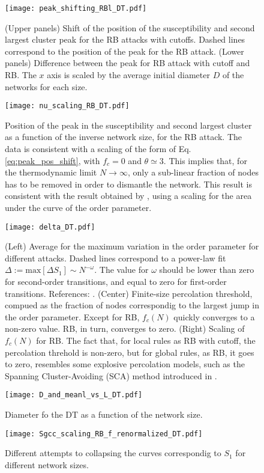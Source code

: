 \documentclass{article}
\begin{document}
\begin{figure}
\centering
\texttt{[image: peak\_shifting\_RBl\_DT.pdf]}
\caption{(Upper panels) Shift of the position of the susceptibility and second largest cluster peak for the RB attacks with cutoffs. Dashed lines correspond to the position of the peak for the RB attack. (Lower panels) Difference between the peak for RB attack with cutoff and RB. The $x$ axis is scaled by the average initial diameter $D$ of the networks for each size.}
\end{figure}

\begin{figure}
\centering
\texttt{[image: nu\_scaling\_RB\_DT.pdf]}
\caption{Position of the peak in the susceptibility and second largest cluster as a function of the inverse network size, for the RB attack. The data is consistent with a scaling of the form of Eq. \ref{eq:peak_pos_shift}, with $f_c = 0$ and $\theta \simeq 3$. This implies that, for the thermodynamic limit $N\rightarrow \infty$, only a sub-linear fraction of nodes has to be removed in order to dismantle the network. This result is consistent with the result obtained by \cite{Norrenbrock2016FragmentationAttacks}, using a scaling for the area under the curve of the order parameter.}
\end{figure}


\begin{figure}
\centering
\texttt{[image: delta\_DT.pdf]}
\caption{(Left) Average for the maximum variation in the order parameter for different attacks. Dashed lines correspond to a power-law fit $\Delta := \mathrm{max}[\Delta S_1] \sim N^{-\omega}$. The value for $\omega$ should be lower than zero for second-order transitions, and equal to zero for first-order transitions. References: \cite{Trevelyan2018DegreeInformation,Bastas2014a,Nagler2011a,Fan2020}. (Center) Finite-size percolation threshold, compued as the fraction of nodes correspondig to the largest jump in the order parameter. Except for RB, $f_c(N)$ quickly converges to a non-zero value. RB, in turn, converges to zero. (Right) Scaling of $f_c(N)$ for RB. The fact that, for local rules as RB with cutoff, the percolation threhold is non-zero, but for global rules, as RB, it goes to zero, resembles some explosive percolation models, such as the Spanning Cluster-Avoiding (SCA) method introduced in \cite{Cho2013}. }
\end{figure}

\begin{figure}
\centering
\texttt{[image: D\_and\_meanl\_vs\_L\_DT.pdf]}
\caption{Diameter fo the DT as a function of the network size.}
\end{figure}

\begin{figure}
\centering
\texttt{[image: Sgcc\_scaling\_RB\_f\_renormalized\_DT.pdf]}
\caption{Different attempts to collapsing the curves correspondig to $S_1$ for different network sizes.}
\end{figure}




\end{document}

